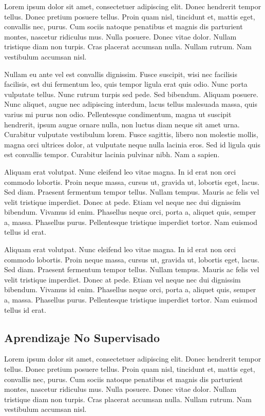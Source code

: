 Lorem ipsum dolor sit amet, consectetuer adipiscing elit.  Donec
hendrerit tempor tellus.  Donec pretium posuere tellus.  Proin quam
nisl, tincidunt et, mattis eget, convallis nec, purus.  Cum sociis
natoque penatibus et magnis dis parturient montes, nascetur ridiculus
mus.  Nulla posuere.  Donec vitae dolor.  Nullam tristique diam non
turpis.  Cras placerat accumsan nulla.  Nullam rutrum.  Nam vestibulum
accumsan nisl.

Nullam eu ante vel est convallis dignissim.  Fusce suscipit, wisi nec
facilisis facilisis, est dui fermentum leo, quis tempor ligula erat
quis odio.  Nunc porta vulputate tellus.  Nunc rutrum turpis sed pede.
Sed bibendum.  Aliquam posuere.  Nunc aliquet, augue nec adipiscing
interdum, lacus tellus malesuada massa, quis varius mi purus non odio.
Pellentesque condimentum, magna ut suscipit hendrerit, ipsum augue
ornare nulla, non luctus diam neque sit amet urna.  Curabitur
vulputate vestibulum lorem.  Fusce sagittis, libero non molestie
mollis, magna orci ultrices dolor, at vulputate neque nulla lacinia
eros.  Sed id ligula quis est convallis tempor.  Curabitur lacinia
pulvinar nibh.  Nam a sapien.

Aliquam erat volutpat.  Nunc eleifend leo vitae magna.  In id erat non
orci commodo lobortis.  Proin neque massa, cursus ut, gravida ut,
lobortis eget, lacus.  Sed diam.  Praesent fermentum tempor tellus.
Nullam tempus.  Mauris ac felis vel velit tristique imperdiet.  Donec
at pede.  Etiam vel neque nec dui dignissim bibendum.  Vivamus id
enim.  Phasellus neque orci, porta a, aliquet quis, semper a, massa.
Phasellus purus.  Pellentesque tristique imperdiet tortor.  Nam
euismod tellus id erat.

Aliquam erat volutpat.  Nunc eleifend leo vitae magna.  In id erat non
orci commodo lobortis.  Proin neque massa, cursus ut, gravida ut,
lobortis eget, lacus.  Sed diam.  Praesent fermentum tempor tellus.
Nullam tempus.  Mauris ac felis vel velit tristique imperdiet.  Donec
at pede.  Etiam vel neque nec dui dignissim bibendum.  Vivamus id
enim.  Phasellus neque orci, porta a, aliquet quis, semper a, massa.
Phasellus purus.  Pellentesque tristique imperdiet tortor.  Nam
euismod tellus id erat.

\subsection{Aprendizaje No Supervisado}

Lorem ipsum dolor sit amet, consectetuer adipiscing elit.  Donec
hendrerit tempor tellus.  Donec pretium posuere tellus.  Proin quam
nisl, tincidunt et, mattis eget, convallis nec, purus.  Cum sociis
natoque penatibus et magnis dis parturient montes, nascetur ridiculus
mus.  Nulla posuere.  Donec vitae dolor.  Nullam tristique diam non
turpis.  Cras placerat accumsan nulla.  Nullam rutrum.  Nam vestibulum
accumsan nisl.

